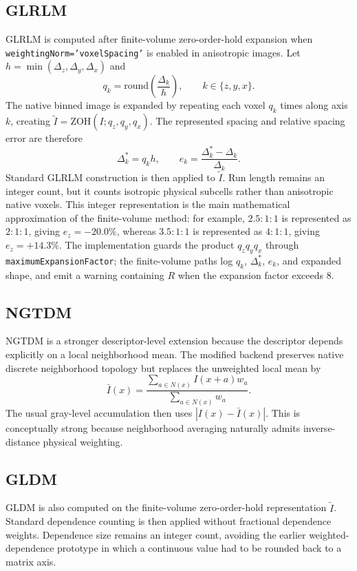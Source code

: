 \documentclass[11pt]{article}
\begin{document}
\subsection{GLRLM}
GLRLM is computed after finite-volume zero-order-hold expansion when \texttt{weightingNorm='voxelSpacing'} is enabled in anisotropic images. Let \(h=\min(\Delta_z,\Delta_y,\Delta_x)\) and
\begin{equation}
q_k=\mathrm{round}\left(\frac{\Delta_k}{h}\right), \qquad k\in\{z,y,x\}.
\end{equation}
The native binned image is expanded by repeating each voxel \(q_k\) times along axis \(k\), creating \(\tilde I=\mathrm{ZOH}(I;q_z,q_y,q_x)\). The represented spacing and relative spacing error are therefore
\begin{equation}
\Delta_k^{*}=q_kh,\qquad
e_k=\frac{\Delta_k^{*}-\Delta_k}{\Delta_k}.
\end{equation}
Standard GLRLM construction is then applied to \(\tilde I\). Run length remains an integer count, but it counts isotropic physical subcells rather than anisotropic native voxels. This integer representation is the main mathematical approximation of the finite-volume method: for example, \(2.5{:}1{:}1\) is represented as \(2{:}1{:}1\), giving \(e_z=-20.0\%\), whereas \(3.5{:}1{:}1\) is represented as \(4{:}1{:}1\), giving \(e_z=+14.3\%\). The implementation guards the product \(q_zq_yq_x\) through \texttt{maximumExpansionFactor}; the finite-volume paths log \(q_k\), \(\Delta_k^{*}\), \(e_k\), and expanded shape, and emit a warning containing \(R\) when the expansion factor exceeds 8.

\subsection{NGTDM}
NGTDM is a stronger descriptor-level extension because the descriptor depends explicitly on a local neighborhood mean. The modified backend preserves native discrete neighborhood topology but replaces the unweighted local mean by
\begin{equation}
\bar I(x) = \frac{\sum_{a\in N(x)} I(x+a)w_a}{\sum_{a\in N(x)} w_a}.
\end{equation}
The usual gray-level accumulation then uses \(|I(x)-\bar I(x)|\). This is conceptually strong because neighborhood averaging naturally admits inverse-distance physical weighting.

\subsection{GLDM}
GLDM is also computed on the finite-volume zero-order-hold representation \(\tilde I\). Standard dependence counting is then applied without fractional dependence weights. Dependence size remains an integer count, avoiding the earlier weighted-dependence prototype in which a continuous value had to be rounded back to a matrix axis.
\end{document}
